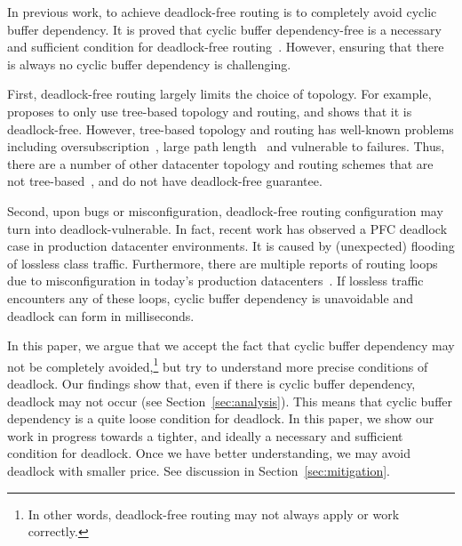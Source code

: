 In previous work, to achieve deadlock-free routing is to completely avoid cyclic buffer dependency.
It is proved that cyclic buffer dependency-free is a necessary and sufficient condition for deadlock-free 
routing~\cite{deadlockfree}.
However, ensuring that there is always no cyclic buffer dependency is challenging.

First, deadlock-free routing largely limits the choice of topology. For example, \cite{tcpbolt}
proposes to only use tree-based topology and routing, and shows that it is deadlock-free. 
However, tree-based topology and routing has well-known problems including oversubscription~\cite{fattree},
large path length~\cite{jellyfish} and vulnerable to failures.
Thus, there are a number of other datacenter topology and routing schemes that are not 
tree-based~\cite{bcube, camcube, jellyfish}, and do not have deadlock-free guarantee. 

Second, upon bugs or misconfiguration, deadlock-free routing configuration may turn into
deadlock-vulnerable. In fact, recent work has observed a PFC deadlock case in production
datacenter environments\cite{rdmascale}. It is caused by (unexpected) flooding of 
lossless class traffic. Furthermore, there are multiple reports of routing loops due to misconfiguration
in today's production datacenters~\cite{everflow, libra}. If lossless traffic encounters
any of these loops, cyclic buffer dependency is unavoidable and deadlock can form in milliseconds.

In this paper, we argue that we accept the fact that cyclic buffer dependency may not be completely 
avoided,\footnote{In other words, deadlock-free routing may not always apply or work correctly.}
but try to understand more precise conditions of deadlock. Our findings show that,
even if there is cyclic buffer dependency, deadlock may not occur (see Section~\ref{sec:analysis}).
This means that cyclic buffer dependency is a quite loose condition for deadlock.
In this paper, we show our work in progress towards a tighter, and ideally a necessary and sufficient 
condition for deadlock. Once we have better understanding, we may avoid deadlock with smaller price. 
See discussion in Section~\ref{sec:mitigation}.


